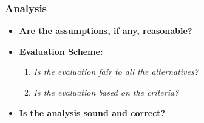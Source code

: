 \subsubsection{Analysis}
\begin{itemize}
\item {\bf Are the assumptions, if any, reasonable? }\\ 

\item {\bf Evaluation Scheme: }
\begin{enumerate}
\item {\it Is the evaluation fair to all the alternatives?}\\ 

\item {\it Is the evaluation based on the criteria?}\\ 

\end{enumerate}
\item {\bf Is the analysis sound and correct? }\\ 

\end{itemize}